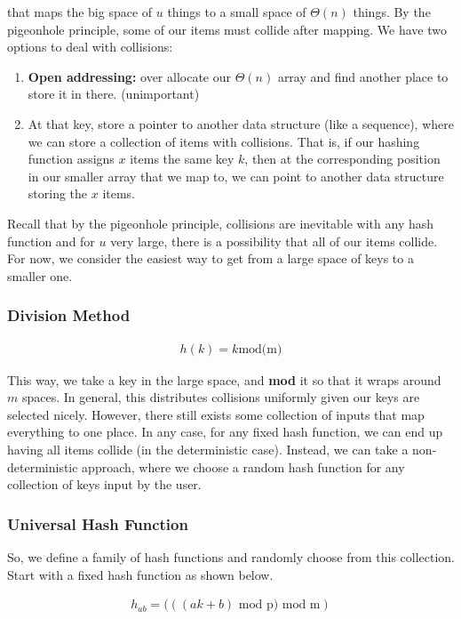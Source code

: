 \documentclass[11pt]{article}
\begin{document}
that maps the big space of $u$ things to a small space of $\Theta(n)$ things. By the pigeonhole 
principle, some of our items must collide after mapping. We have two options to deal with 
collisions:
\begin{enumerate}
    \item \textbf{Open addressing:} over allocate our $\Theta(n)$ array and find another place to 
        store it in there. (unimportant)
    \item At that key, store a pointer to another data structure (like a sequence), where we can 
        store a collection of items with collisions. That is, if our hashing function assigns $x$
        items the same key $k$, then at the corresponding position in our smaller array that we 
        map to, we can point to another data structure storing the $x$ items.
\end{enumerate}
Recall that by the pigeonhole principle, collisions are inevitable with any hash function and for 
$u$ very large, there is a possibility that all of our items collide. For now, we consider the 
easiest way to get from a large space of keys to a smaller one.

\subsubsection{Division Method}

\begin{align*}
    h(k)=k \text{mod(m)}
\end{align*}

This way, we take a key in the large space, and \textbf{mod} it so that it wraps around $m$ spaces.
In general, this distributes collisions uniformly given our keys are selected nicely. However, there
still exists some collection of inputs that map everything to one place. In any case, for any fixed
hash function, we can end up having all items collide (in the deterministic case). Instead, we can 
take a non-deterministic approach, where we choose a random hash function for any collection of 
keys input by the user.

\subsubsection{Universal Hash Function}
So, we define a family of hash functions and randomly choose from this collection. Start with a 
fixed hash function as shown below.

\begin{align*}
    h_{ab}=(((ak+b)\text{ mod p) mod m}) 
\end{align*}
\end{document}
